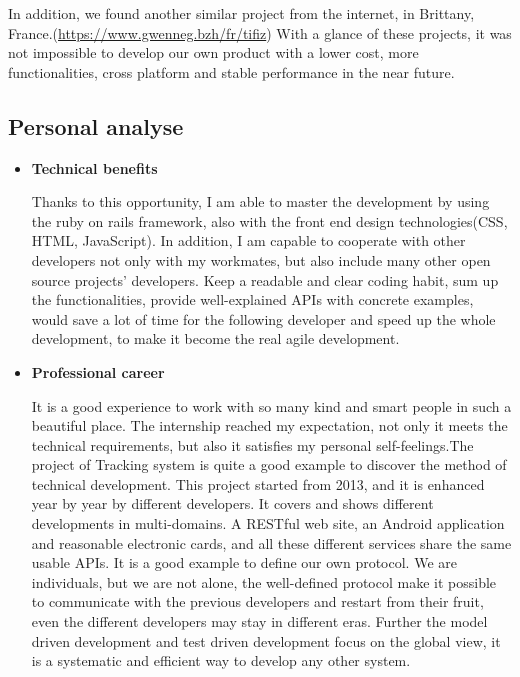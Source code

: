 In addition, we found another similar project from the internet, in Brittany, France.(\url{https://www.gwenneg.bzh/fr/tifiz}) With a glance of these projects, it was not impossible to develop our own product with a lower cost, more functionalities, cross platform and stable performance in the near future.
\subsection{Personal analyse}
\begin{itemize}
\item{\textbf{Technical benefits}}

Thanks to this opportunity, I am able to master the development by using the ruby on rails framework, also with the front end design technologies(CSS, HTML, JavaScript). In addition, I am capable to cooperate with other developers not only with my workmates, but also include many other open source projects' developers. Keep a readable and clear coding habit, sum up the functionalities, provide well-explained APIs with concrete examples, would save a lot of time for the following developer and speed up the whole development, to make it become the real agile development.

\item{\textbf{Professional career}}

It is a good experience to work with so many kind and smart people in such a beautiful place. The internship reached my expectation, not only it meets the technical requirements, but also it satisfies my personal self-feelings.The project of Tracking system is quite a good example to discover the method of technical development. This project started from 2013, and it is enhanced year by year by different developers. It covers and shows different developments in multi-domains. A RESTful web site, an Android application and reasonable electronic cards, and all these different services share the same usable APIs. It is a good example to define our own protocol. We are individuals, but we are not alone, the well-defined protocol make it possible to communicate with the previous developers and restart from their fruit, even the different developers may stay in different eras. Further the model driven development and test driven development focus on the global view, it is a systematic and efficient way to develop any other system.

\end{itemize}
